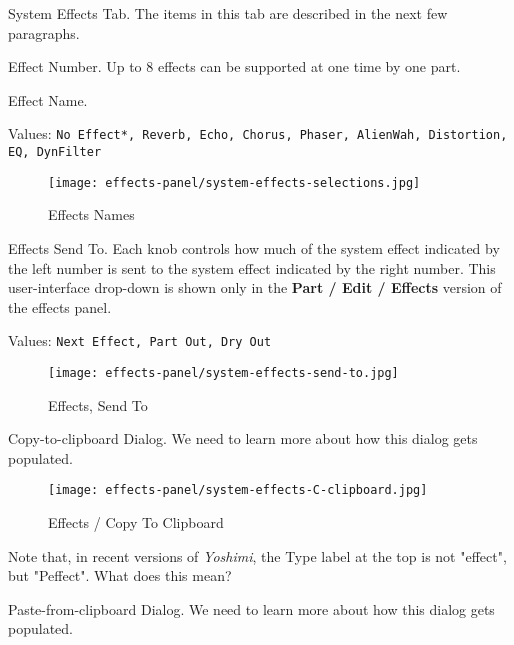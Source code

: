    \setcounter{ItemCounter}{0}      %

   System Effects Tab.
   The items in this tab are described in the next few paragraphs.

   Effect Number.
   Up to 8 effects can be supported at one time by one part.

   Effect Name.

   Values: \texttt{No Effect*, Reverb, Echo, Chorus, Phaser, AlienWah,
      Distortion, EQ, DynFilter}

\begin{figure}[H]
   \centering
   \texttt{[image: effects-panel/system-effects-selections.jpg]}
   \caption{Effects Names}
   \label{fig:effects_names}
\end{figure}

   Effects Send To.
   Each knob controls how much of the system effect indicated by the left
   number is sent to the system effect indicated by the right number.
   This user-interface drop-down is shown only in the
   \textbf{Part / Edit / Effects} version of the effects panel.

   Values: \texttt{Next Effect, Part Out, Dry Out}

\begin{figure}[H]
   \centering
   \texttt{[image: effects-panel/system-effects-send-to.jpg]}
   \caption{Effects, Send To}
   \label{fig:effects_send_to}
\end{figure}

   Copy-to-clipboard Dialog.
   We need to learn more about how this dialog gets populated.

\begin{figure}[H]
   \centering
   \texttt{[image: effects-panel/system-effects-C-clipboard.jpg]}
   \caption{Effects / Copy To Clipboard}
   \label{fig:effects_copy_to_clipboard}
\end{figure}

   Note that, in recent versions of \textsl{Yoshimi}, the Type label at the top
   is not "effect", but "Peffect".  What does this mean?

   Paste-from-clipboard Dialog.
   We need to learn more about how this dialog gets populated.

